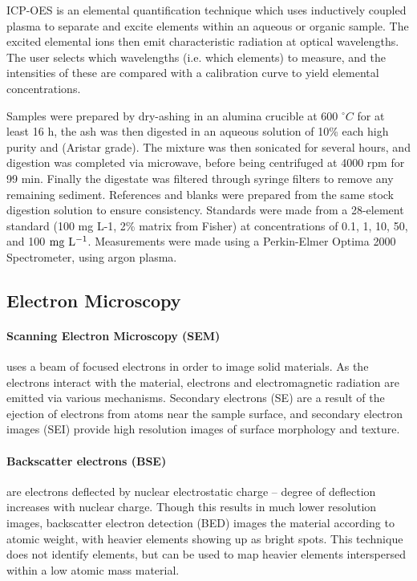 ICP-OES is an elemental quantification technique which uses inductively coupled plasma to separate and excite elements within an aqueous or organic sample. The excited elemental ions then emit characteristic radiation at optical wavelengths. The user selects which wavelengths (i.e. which elements) to measure, and the intensities of these are compared with a calibration curve to yield elemental concentrations.\cite{Hinners1988interlaboratory}

Samples were prepared by dry-ashing in an alumina crucible at 600 $^{\circ}C$ for at least 16 h, the ash was then digested in an aqueous solution of 10\% each high purity  and  (Aristar grade). The mixture was then sonicated for several hours, and digestion was completed via microwave, before being centrifuged at 4000 rpm for 99 min. Finally the digestate was filtered through syringe filters to remove any remaining sediment. References and blanks were prepared from the same stock digestion solution to ensure consistency. Standards were made from a 28-element standard (100 mg L-1, 2\%  matrix from Fisher) at concentrations of 0.1, 1, 10, 50, and 100 $\rm mg\ L^{-1}$. Measurements were made using a Perkin-Elmer Optima 2000 Spectrometer, using argon plasma.

\subsection{Electron Microscopy}
\paragraph{Scanning Electron Microscopy (SEM)} uses a beam of focused electrons in order to image solid materials. As the electrons interact with the material, electrons and electromagnetic radiation are emitted via various mechanisms. Secondary electrons (SE) are a result of the ejection of electrons from atoms near the sample surface, and secondary electron images (SEI) provide high resolution images of surface morphology and texture.\cite{Goldstein2017Scanning} 

\paragraph{Backscatter electrons (BSE)} are electrons deflected by nuclear electrostatic charge – degree of deflection increases with nuclear charge. Though this results in much lower resolution images, backscatter electron detection (BED) images the material according to atomic weight, with heavier elements showing up as bright spots. This technique does not identify elements, but can be used to map heavier elements interspersed within a low atomic mass material.\cite{Goldstein2017Scanning}

